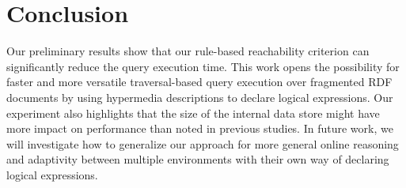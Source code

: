 \section{Conclusion}

Our preliminary results show that our rule-based reachability criterion can significantly reduce the query execution time.
This work opens the possibility for faster and more versatile traversal-based query execution over fragmented RDF documents by using hypermedia descriptions to declare logical expressions.
Our experiment also highlights that the size of the internal data store might have more impact on performance than noted in previous studies.
In future work, we will investigate how to generalize our approach for more general online reasoning and adaptivity between multiple environments with their own way of declaring logical expressions.